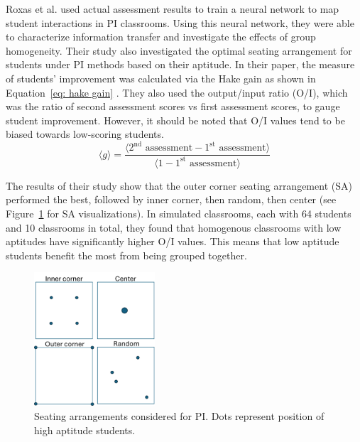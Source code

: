 \documentclass[twocolumn,secnumarabic,amssymb, nobibnotes, aps, prd]{revtex4-2}
\begin{document}
    Roxas et al. \cite{roxas2010seating} used actual assessment results to train a neural network to map student interactions in PI classrooms. 
    Using this neural network, they were able to characterize information transfer and investigate the effects of group homogeneity. 
    Their study also investigated the optimal seating arrangement for students under PI methods based on their aptitude.
    In their paper, the measure of students' improvement was calculated via the Hake gain as shown in Equation~\ref{eq: hake gain} \cite{hake1998}.
    They also used the output/input ratio (O/I), which was the ratio of second assessment scores vs first assessment scores, to gauge student improvement.
    However, it should be noted that O/I values tend to be biased towards low-scoring students.
    \begin{equation}
        \label{eq: hake gain}
        \langle g \rangle = \frac{\langle 2^{\text{nd}}\text{ assessment} - 1^{\text{st}}\text{ assessment} \rangle}{\langle 1 - 1^{\text{st}}\text{ assessment} \rangle}
    \end{equation}

    The results of their study show that the outer corner seating arrangement (SA) performed the best, followed by inner corner, then random, then center (see Figure~\ref{fig:PI SAs} for SA visualizations).
    In simulated classrooms, each with 64 students and 10 classrooms in total, they found that homogenous classrooms with low aptitudes have significantly higher O/I values.
    This means that low aptitude students benefit the most from being grouped together.

    \begin{figure}[htbp!]
        \centering
        \includegraphics[width=0.40\textwidth]{figures/PI SAs.png}
        \caption{Seating arrangements considered for PI. Dots represent position of high aptitude students.}
        \label{fig:PI SAs}
    \end{figure}
\end{document}
